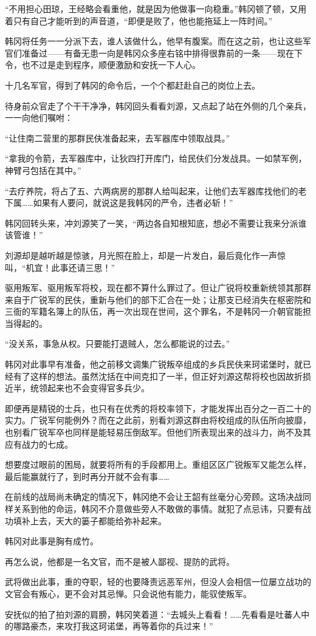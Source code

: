 “不用担心田琼，王经略会看重他，就是因为他做事一向稳重。”韩冈顿了顿，又用着只有自己才能听到的声音道，“即便是败了，他也能拖延上一阵时间。”

韩冈将任务一一分派下去，谁人该做什么，他早有腹案。而在这之前，也让这些军官们准备过——有备无患一向是韩冈众多座右铭中排得很靠前的一条——现在下令，也不过是走到程序，顺便激励和安抚一下人心。

十几名军官，得到了韩冈的命令后，一个个都赶赴自己的岗位上去。

待身前众官走了个干干净净，韩冈回头看看刘源，又点起了站在外侧的几个亲兵，一一向他们嘱咐：

“让住南二营里的那群民伕准备起来，去军器库中领取战具。”

“拿我的令箭，去军器库中，让狄四打开库门，给民伕们分发战具。一如禁军例，神臂弓包括在其中。”

“去疗养院，将占了五、六两病房的那群人给叫起来，让他们去军器库找他们的老下属……如果有人要问，就说这是我韩冈的严令，违者必斩！”

韩冈回转头来，冲刘源笑了一笑，“两边各自知根知底，想必不需要让我来分派谁该管谁！”

刘源却是越听越是惊骇，月光照在脸上，却是一片发白，最后竟化作一声惊叫，“机宜！此事还请三思！”

驱用叛军、驱用叛军将校，现在都不算什么罪过了。但让广锐将校重新统领其那群来自于广锐军的民伕，重新与他们的部下汇合在一处；让那支已经消失在枢密院和三衙的军籍名簿上的队伍，再一次出现在世间，这个罪名，不是韩冈一介朝官能担当得起的。

“没关系，事急从权。只要能打退贼人，怎么都能说的过去。”

韩冈对此事早有准备，他之前移文调集广锐叛卒组成的乡兵民伕来珂诺堡时，就已经有了这样的想法。虽然沈括在中间克扣了一半，但正好刘源这帮将校也因故折损近半，统领起来也不会变得官多兵少。

即便再是精锐的士兵，也只有在优秀的将校率领下，才能发挥出百分之一百二十的实力。广锐军何能例外？而在之此前，别看刘源这群由将校组成的队伍所向披靡，也别看广锐军卒也同样是能轻易压倒敌军。但他们所表现出来的战斗力，尚不及其应有战力的七成。

想要度过眼前的困局，就要将所有的手段都用上。重组区区广锐叛军又能怎么样，最后能赢就行了，到时再分开就不会有事……

在前线的战局尚未确定的情况下，韩冈绝不会让王韶有丝毫分心旁顾。这场决战同样关系到他的命运，韩冈不介意做些旁人不敢做的事情。就犯了点忌讳，只要有战功填补上去，天大的篓子都能给弥补起来。

韩冈对此事是胸有成竹。

再怎么说，他都是一名文官，而不是被人鄙视、提防的武将。

武将做出此事，重的夺职，轻的也要降责远恶军州，但没人会相信一位屡立战功的文官会有叛心，更不会对其忌惮。只会说他有能力，能驭使叛军。

安抚似的拍了拍刘源的肩膀，韩冈笑着道：“去城头上看看！……先看看是吐蕃人中的哪路豪杰，来攻打我这珂诺堡，再等着你的兵过来！”

